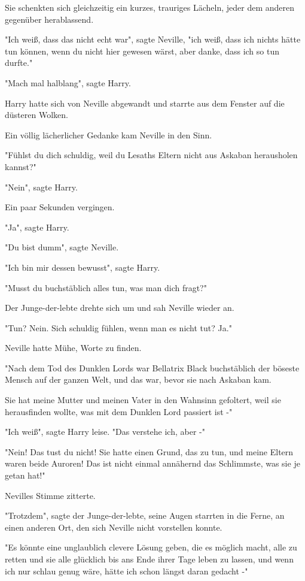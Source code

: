 {Sie schenkten sich gleichzeitig ein kurzes, trauriges Lächeln, jeder dem anderen gegenüber herablassend.

"Ich weiß, dass das nicht echt war", sagte Neville, "ich weiß, dass ich nichts hätte tun können, wenn du nicht hier gewesen wärst, aber danke, dass ich so tun durfte."

"Mach mal halblang", sagte Harry.

Harry hatte sich von Neville abgewandt und starrte aus dem Fenster auf die düsteren Wolken.

Ein völlig lächerlicher Gedanke kam Neville in den Sinn.

"Fühlst du dich schuldig, weil du Lesaths Eltern nicht aus Askaban herausholen kannst?"

"Nein", sagte Harry.

Ein paar Sekunden vergingen.

"Ja", sagte Harry.

"Du bist dumm", sagte Neville.

"Ich bin mir dessen bewusst", sagte Harry.

"Musst du buchstäblich alles tun, was man dich fragt?"

Der Junge-der-lebte drehte sich um und sah Neville wieder an.

"Tun? Nein. Sich schuldig fühlen, wenn man es nicht tut? Ja."

Neville hatte Mühe, Worte zu finden.

"Nach dem Tod des Dunklen Lords war Bellatrix Black buchstäblich der böseste Mensch auf der ganzen Welt, und das war, bevor sie nach Askaban kam.

Sie hat meine Mutter und meinen Vater in den Wahnsinn gefoltert, weil sie herausfinden wollte, was mit dem Dunklen Lord passiert ist -"

"Ich weiß", sagte Harry leise. "Das verstehe ich, aber -"

"Nein! Das tust du nicht! Sie hatte einen Grund, das zu tun, und meine Eltern waren beide Auroren! Das ist nicht einmal annähernd das Schlimmste, was sie je getan hat!"

Nevilles Stimme zitterte.

"Trotzdem", sagte der Junge-der-lebte, seine Augen starrten in die Ferne, an einen anderen Ort, den sich Neville nicht vorstellen konnte.

"Es könnte eine unglaublich clevere Lösung geben, die es möglich macht, alle zu retten und sie alle glücklich bis ans Ende ihrer Tage leben zu lassen, und wenn ich nur schlau genug wäre, hätte ich schon längst daran gedacht -"

}
